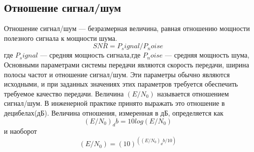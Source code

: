 \subsection{Отношение сигнал/шум}
Отношение сигнал/шум --- безразмерная величина, равная отношению мощности полезного сигнала к мощности шума.
\begin{equation}
SNR=P_signal/P_noise   
\end{equation} 
где $P_signal$ --- средняя мощность сигнала,где $P_noise$ --- средняя мощность шума,
Основными параметрами системы передачи являются скорость передачи, ширина полосы частот и отношение сигнал/шум. Эти параметры обычно являются исходными, и при заданных значениях этих параметров требуется обеспечить требуемое качество передачи.
Величина
$(E/N_0)$ называется отношением сигнал/шум.  В инженерной практике принято выражать это отношение в децибелах(дБ).  Величина отношения, измеренная в дБ, определяется как
\begin{equation}
(E/N_0 )_db=10 log⁡(E/N_0 )   
\end{equation} 
и наоборот
\begin{equation}
(E/N_0 )=(10)^((E/N_0 )_db/10)   
\end{equation} 

